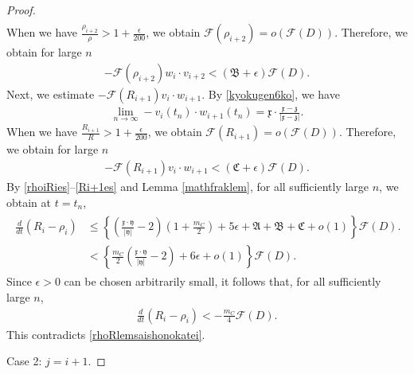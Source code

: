 \documentclass[10pt,a4paper]{amsart}
\numberwithin{equation}{section}
\begin{document}
\begin{proof}
\begin{align*}
\end{align*}
When we have $\frac{\rho_{i+2}}{\rho}>1+\frac{\epsilon}{200}$, we obtain $\mathcal{F}(\rho_{i+2})=o(\mathcal{F}(D))$. 
Therefore, we obtain for large $n$
\begin{align}\label{rhoi+2es}
-\mathcal{F}(\rho_{i+2})w_i\cdot v_{i+2}<\left(\mathfrak{B}+\epsilon\right)\mathcal{F}(D).
\end{align}
Next, we estimate $-\mathcal{F}(R_{i+1})v_i\cdot w_{i+1}$. By \eqref{kyokugen6ko}, we have
\begin{align*}
\lim_{n\to\infty}-v_i(t_n)\cdot w_{i+1}(t_n)=\mathfrak{x}\cdot \frac{\mathfrak{x}-\mathfrak{z}}{|\mathfrak{x}-\mathfrak{z}|}.
\end{align*}
When we have $\frac{R_{i+1}}{R}>1+\frac{\epsilon}{200}$, we obtain $\mathcal{F}(R_{i+1})=o(\mathcal{F}(D))$. Therefore, we obtain for large $n$
\begin{align}\label{Ri+1es}
-\mathcal{F}(R_{i+1})v_i\cdot w_{i+1}<\left(\mathfrak{C}+\epsilon\right)\mathcal{F}(D).
\end{align}
By \eqref{rhoiRies}--\eqref{Ri+1es} and Lemma \ref{mathfraklem}, for all sufficiently large $n$, we obtain at $t=t_n$,
\begin{align}\label{i=jcasees}
\begin{aligned}
\frac{d}{dt}\left(R_i-\rho_i\right)&\leq \left\{\left(\frac{\mathfrak{x}\cdot \mathfrak{y}}{|\mathfrak{y}|}-2\right)\left(1+\frac{m_C}{2}\right)+5\epsilon+\mathfrak{A}+\mathfrak{B}+\mathfrak{C}+o(1)\right\} \mathcal{F}(D).
\\
&<\left\{ \frac{m_C}{2}\left(\frac{\mathfrak{x}\cdot\mathfrak{y}}{|\mathfrak{y}|}-2\right)+6\epsilon+o(1)\right\}\mathcal{F}(D).
\end{aligned}
\end{align}
Since $\epsilon>0$ can be chosen arbitrarily small, it follows that, for all sufficiently large $n$,
\begin{align*}
\frac{d}{dt}\left(R_i-\rho_i\right)
<
-\frac{m_C}{4}\mathcal{F}(D).
\end{align*}
This contradicts \eqref{rhoRlemsaishonokatei}.




Case 2: $j=i+1$.


\end{proof}
\end{document}
